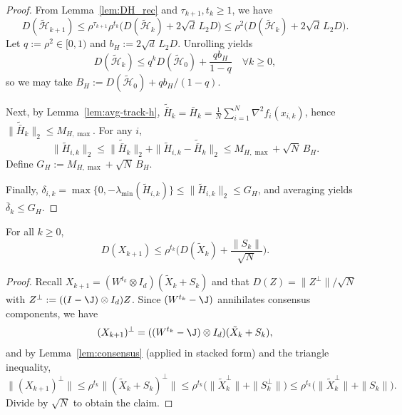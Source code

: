 \documentclass[review,onefignum,onetabnum]{siamart171218}
\begin{document}
	\begin{proof}
		From Lemma~\ref{lem:DH_rec} and $\tau_{k+1},t_k\ge 1$, we have
		\[
		D(\tilde{\mathcal H}_{k+1})
		\le \rho^{\tau_{k+1}}\rho^{t_k}\Big(D(\tilde{\mathcal H}_k)+2\sqrt d\,L_2D\Big)
		\le \rho^2\Big(D(\tilde{\mathcal H}_k)+2\sqrt d\,L_2D\Big).
		\]
		Let $q:=\rho^2\in[0,1)$ and $b_H:=2\sqrt d\,L_2D$. Unrolling yields
		\[
		D(\tilde{\mathcal H}_k)\le q^k D(\tilde{\mathcal H}_0)+\frac{qb_H}{1-q}\quad \forall k\ge 0,
		\]
		so we may take $B_H:=D(\tilde{\mathcal H}_0)+qb_H/(1-q)$.
		
		Next, by Lemma~\ref{lem:avg-track-h},
		$\tilde{\bar H}_k=\bar H_k=\frac1N\sum_{i=1}^N\nabla^2 f_i(x_{i,k})$,
		hence $\|\tilde{\bar H}_k\|_2\le M_{H,\max}$.
		For any $i$,
		\[
		\|\tilde H_{i,k}\|_2
		\le \|\tilde{\bar H}_k\|_2
		+ \|\tilde H_{i,k}\!-\!\tilde{\bar H}_k\|_2
		\le M_{H,\max}\!+\!\sqrt{N}\,B_H.
		\]
		Define $G_H:=M_{H,\max} + \sqrt{N}\,B_H$.
		
		Finally, $\delta_{i,k}=\max\{0,-\lambda_{\min}(\tilde H_{i,k})\}
		\le \|\tilde H_{i,k}\|_2\le G_H$,
		and averaging yields $\bar\delta_k\le G_H$.
	\end{proof}
	
	\begin{lemma}\label{lem:DX_post}
		For all $k\ge 0$,
		\[
		D(X_{k+1})\le \rho^{t_k}\Big(D(\tilde X_k)+\frac{\|S_k\|}{\sqrt N}\Big).
		\]
	\end{lemma}
	\begin{proof}
		Recall $X_{k+1}=(W^{t_k}\otimes I_d)(\tilde X_k+S_k)$ and that $D(Z)=\|Z^\perp\|/\sqrt N$ with $Z^\perp:=((I-\J)\otimes I_d)Z$.
		Since $(W^{t_k}-\J)$ annihilates consensus components, we have
		\[
		(X_{k+1})^\perp = ((W^{t_k}-\J)\otimes I_d)(\tilde X_k+S_k),
		\]
		and by Lemma~\ref{lem:consensus} (applied in stacked form) and the triangle inequality,
		\[
		\| (X_{k+1})^\perp\|
		\le \rho^{t_k}\|(\tilde X_k+S_k)^\perp\|
		\le \rho^{t_k}\big(\|\tilde X_k^\perp\|+\|S_k^\perp\|\big)
		\le \rho^{t_k}\big(\|\tilde X_k^\perp\|+\|S_k\|\big).
		\]
		Divide by $\sqrt N$ to obtain the claim.
	\end{proof}
	
\end{document}
